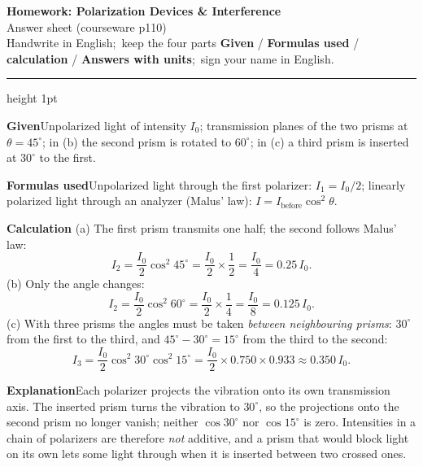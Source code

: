 \documentclass[10.5pt]{ctexart}
\begin{document}
\begin{center}
{\LARGE\bfseries\color{violetdeep} Homework: Polarization Devices \& Interference}\\[5pt]
{\color{petal}\small {}\enspace Answer sheet (courseware p110)\enspace {}}\\[4pt]
{\small\color{inkgray}Handwrite in English;\ keep the four parts \textbf{Given} / \textbf{Formulas used} /
\textbf{calculation} / \textbf{Answers with units};\ sign your name in English.}
\end{center}
\vspace{-2pt}
{\color{petal}\hrule height 1pt}


\textbf{Given}\quad Unpolarized light of intensity $I_0$; transmission planes of the two prisms at
$\theta=45^{\circ}$; in (b) the second prism is rotated to $60^{\circ}$; in (c) a third prism is inserted at
$30^{\circ}$ to the first.

\textbf{Formulas used}\quad Unpolarized light through the first polarizer: $I_1=I_0/2$;\quad
linearly polarized light through an analyzer (Malus' law): $I=I_{\text{before}}\cos^{2}\theta$.

\textbf{Calculation}\quad
(a) The first prism transmits one half; the second follows Malus' law:
\begin{equation*}
I_2=\frac{I_0}{2}\cos^{2}45^{\circ}=\frac{I_0}{2}\times\frac12=\frac{I_0}{4}=0.25\,I_0 .
\end{equation*}
(b) Only the angle changes:
\begin{equation*}
I_2=\frac{I_0}{2}\cos^{2}60^{\circ}=\frac{I_0}{2}\times\frac14=\frac{I_0}{8}=0.125\,I_0 .
\end{equation*}
(c) With three prisms the angles must be taken \emph{between neighbouring prisms}: $30^{\circ}$ from the first
to the third, and $45^{\circ}-30^{\circ}=15^{\circ}$ from the third to the second:
\begin{equation*}
I_3=\frac{I_0}{2}\cos^{2}30^{\circ}\cos^{2}15^{\circ}
=\frac{I_0}{2}\times0.750\times0.933\approx0.350\,I_0 .
\end{equation*}

\textbf{Explanation}\quad Each polarizer projects the vibration onto its own transmission axis. The inserted
prism turns the vibration to $30^{\circ}$, so the projections onto the second prism no longer vanish; neither
$\cos30^{\circ}$ nor $\cos15^{\circ}$ is zero. Intensities in a chain of polarizers are therefore \emph{not}
additive, and a prism that would block light on its own lets some light through when it is inserted between
two crossed ones.
\end{document}
